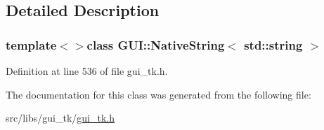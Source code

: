 \subsection{Detailed Description}
\subsubsection*{template$<$$>$class G\-U\-I\-::\-Native\-String$<$ std\-::string $>$}



Definition at line 536 of file gui\-\_\-tk.\-h.



The documentation for this class was generated from the following file\-:\begin{DoxyCompactItemize}
\item 
src/libs/gui\-\_\-tk/\hyperlink{gui__tk_8h}{gui\-\_\-tk.\-h}\end{DoxyCompactItemize}
